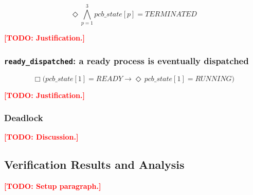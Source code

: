 \documentclass[11pt,a4paper]{article}
\newcommand{\always}{\ensuremath{\Box}}
\newcommand{\eventually}{\ensuremath{\Diamond}}
\newcommand{\code}[1]{\texttt{#1}}
\newcommand{\todo}[1]{\textcolor{red}{\textbf{[TODO: #1]}}}
\begin{document}
\[ \eventually \bigwedge_{p=1}^{3} \mathit{pcb\_state}[p] = \mathit{TERMINATED} \]

\todo{Justification.}

\subsubsection*{\code{ready\_dispatched}: a ready process is eventually dispatched}

\[ \always \bigl( \mathit{pcb\_state}[1] = \mathit{READY} \rightarrow
   \eventually\, \mathit{pcb\_state}[1] = \mathit{RUNNING} \bigr) \]

\todo{Justification.}

\subsubsection*{Deadlock}

\todo{Discussion.}

\subsection{Verification Results and Analysis}

%

\todo{Setup paragraph.}
\end{document}
